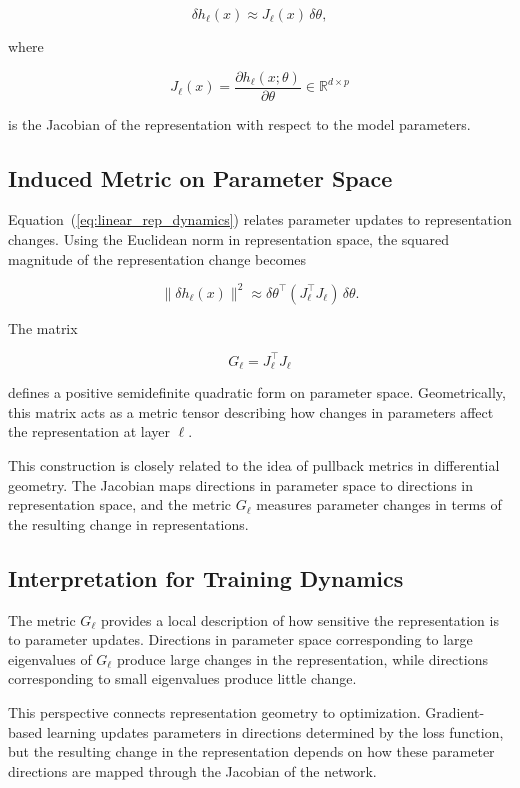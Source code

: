 \documentclass[11pt]{article}
\begin{document}
\begin{equation}
\delta h_\ell(x)
\approx
J_\ell(x) \, \delta \theta ,
\label{eq:linear_rep_dynamics}
\end{equation}

where

\[
J_\ell(x)
=
\frac{\partial h_\ell(x;\theta)}{\partial \theta}
\in \mathbb{R}^{d \times p}
\]

is the Jacobian of the representation with respect to the model parameters.

\subsection{Induced Metric on Parameter Space}

Equation~(\ref{eq:linear_rep_dynamics}) relates parameter updates to
representation changes.
Using the Euclidean norm in representation space, the squared magnitude of
the representation change becomes

\begin{equation}
\|\delta h_\ell(x)\|^2
\approx
\delta\theta^\top (J_\ell^\top J_\ell)\, \delta\theta .
\label{eq:rep_change_metric}
\end{equation}

The matrix

\[
G_\ell = J_\ell^\top J_\ell
\]

defines a positive semidefinite quadratic form on parameter space.
Geometrically, this matrix acts as a metric tensor describing how changes
in parameters affect the representation at layer $\ell$.

This construction is closely related to the idea of pullback metrics in
differential geometry.
The Jacobian maps directions in parameter space to directions in
representation space, and the metric $G_\ell$ measures parameter changes in
terms of the resulting change in representations.

\subsection{Interpretation for Training Dynamics}

The metric $G_\ell$ provides a local description of how sensitive the
representation is to parameter updates.
Directions in parameter space corresponding to large eigenvalues of
$G_\ell$ produce large changes in the representation, while directions
corresponding to small eigenvalues produce little change.

This perspective connects representation geometry to optimization.
Gradient-based learning updates parameters in directions determined by the
loss function, but the resulting change in the representation depends on
how these parameter directions are mapped through the Jacobian of the
network.
\end{document}
